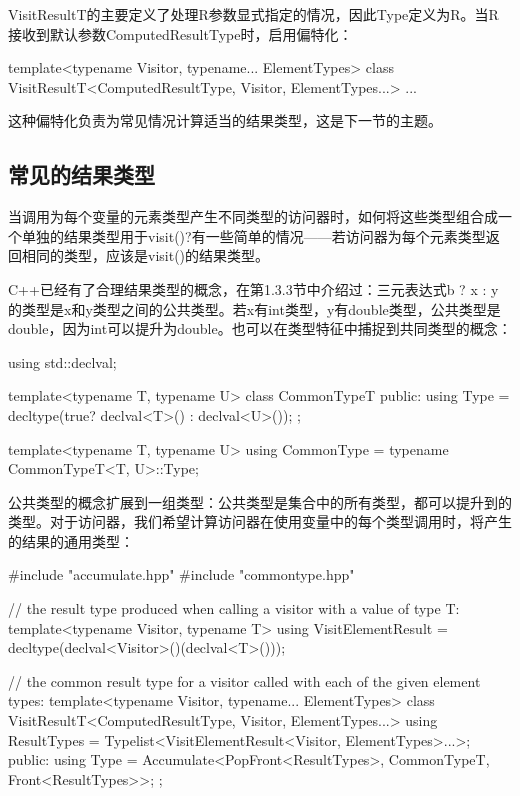 VisitResultT的主要定义了处理R参数显式指定的情况，因此Type定义为R。当R接收到默认参数ComputedResultType时，启用偏特化：

\begin{cpp}
template<typename Visitor, typename... ElementTypes>
class VisitResultT<ComputedResultType, Visitor, ElementTypes...> {
	...
}
\end{cpp}

这种偏特化负责为常见情况计算适当的结果类型，这是下一节的主题。

\subsection{常见的结果类型}

当调用为每个变量的元素类型产生不同类型的访问器时，如何将这些类型组合成一个单独的结果类型用于visit()?有一些简单的情况——若访问器为每个元素类型返回相同的类型，应该是visit()的结果类型。

C++已经有了合理结果类型的概念，在第1.3.3节中介绍过：三元表达式b ? x : y的类型是x和y类型之间的公共类型。若x有int类型，y有double类型，公共类型是double，因为int可以提升为double。也可以在类型特征中捕捉到共同类型的概念：

\begin{cpp}
using std::declval;

template<typename T, typename U>
class CommonTypeT {
	public:
	using Type = decltype(true? declval<T>() : declval<U>());
};

template<typename T, typename U>
using CommonType = typename CommonTypeT<T, U>::Type;
\end{cpp}

公共类型的概念扩展到一组类型：公共类型是集合中的所有类型，都可以提升到的类型。对于访问器，我们希望计算访问器在使用变量中的每个类型调用时，将产生的结果的通用类型：

\begin{cpp}
#include "accumulate.hpp"
#include "commontype.hpp"

// the result type produced when calling a visitor with a value of type T:
template<typename Visitor, typename T>
using VisitElementResult = decltype(declval<Visitor>()(declval<T>()));

// the common result type for a visitor called with each of the given element types:
template<typename Visitor, typename... ElementTypes>
class VisitResultT<ComputedResultType, Visitor, ElementTypes...> {
	using ResultTypes =
		Typelist<VisitElementResult<Visitor, ElementTypes>...>;
	public:
	using Type =
		Accumulate<PopFront<ResultTypes>, CommonTypeT, Front<ResultTypes>>;
};
\end{cpp}

